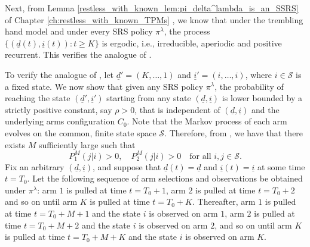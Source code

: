 Next, from Lemma \ref{restless_with_known_lem:pi_delta^lambda_is_an_SSRS} of Chapter \ref{ch:restless_with_known_TPMs} , we know that under the trembling hand model and under every SRS policy $\pi^\lambda$, the process $\{(\underline{d}(t), \underline{i}(t)): t\geq K\}$ is ergodic, i.e., irreducible, aperiodic and positive recurrent. This verifies the analogue of \cite[Assumption A4]{borkar1982identification}.

To verify the analogue of \cite[Condition C2]{federgruen1978note}, let $\underline{d}'=(K, \ldots, 1)$ and $\underline{i}'=(i, \ldots, i)$, where $i\in \mathcal{S}$ is a fixed state. We now show that given any SRS policy $\pi^\lambda$, the probability of reaching the state $(\underline{d}', \underline{i}')$ starting from any state $(\underline{d}, \underline{i})$ is lower bounded by a strictly positive constant, say $\rho>0$, that is independent of $(\underline{d}, \underline{i})$ and the underlying arms configuration $C_0$. Note that the Markov process of each arm evolves on the common, finite state space $\mathcal{S}$. Therefore, from \cite[Proposition 1.7]{milgrom2002envelope}, we have that there exists $M$ sufficiently large such that $$ P_1^M(j|i)>0, \quad P_2^M(j|i)>0\quad \text{for all }i,j\in \mathcal{S}. $$ Fix an arbitrary $(\underline{d}, \underline{i})$, and suppose that $\underline{d}(t)=\underline{d}$ and $\underline{i}(t)=\underline{i}$ at some time $t=T_0$. Let the following sequence of arm selections and observations be obtained under $\pi^\lambda$: arm $1$ is pulled at time $t=T_0+	1$, arm $2$ is pulled at time $t=T_0+2$ and so on until arm $K$ is pulled at time $t=T_0+K$. Thereafter, arm $1$ is pulled at time $t=T_0+M+1$ and the state $i$ is observed on arm $1$, arm $2$ is pulled at time $t=T_0+M+2$ and the state $i$ is observed on arm $2$, and so on until arm $K$ is pulled at time $t=T_0+M+K$ and the state $i$ is observed on arm $K$.

